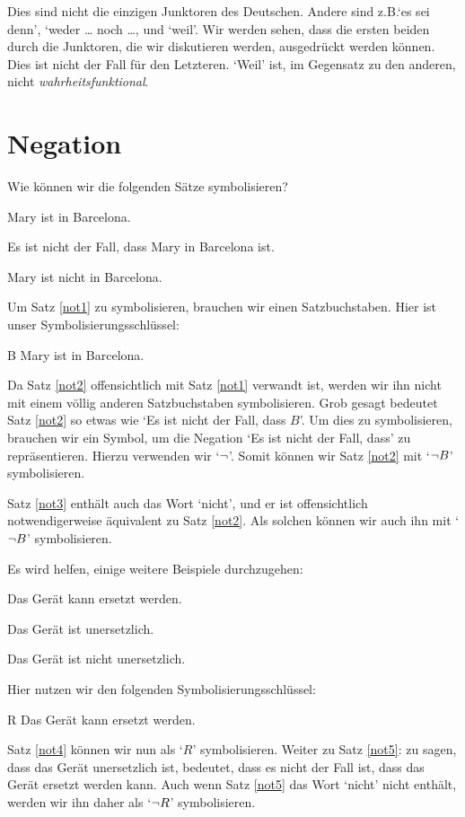 Dies sind nicht die einzigen Junktoren des Deutschen. Andere sind z.B.\@ `es sei denn', `weder \dots{} noch \dots{}, und `weil'. Wir werden sehen, dass die ersten beiden durch die Junktoren, die wir diskutieren werden, ausgedrückt werden können. Dies ist nicht der Fall für den Letzteren. `Weil' ist, im Gegensatz zu den anderen, nicht \emph{wahrheitsfunktional}. 
    
\section{Negation}

Wie können wir die folgenden Sätze symbolisieren?
	\begin{earg}
	\item[\ex{not1}] Mary ist in Barcelona.
	\item[\ex{not2}] Es ist nicht der Fall, dass Mary in Barcelona ist.
	\item[\ex{not3}] Mary ist nicht in Barcelona.
	\end{earg}
Um Satz \ref{not1} zu symbolisieren, brauchen wir einen Satzbuchstaben. Hier ist unser Symbolisierungsschlüssel:
	\begin{ekey}
		\item[B] Mary ist in Barcelona.
	\end{ekey}
Da Satz \ref{not2} offensichtlich mit Satz \ref{not1} verwandt ist, werden wir ihn nicht mit einem völlig anderen Satzbuchstaben symbolisieren. Grob gesagt bedeutet Satz \ref{not2} so etwas wie `Es ist nicht der Fall, dass $B$'. Um dies zu symbolisieren, brauchen wir ein Symbol, um die Negation `Es ist nicht der Fall, dass' zu repräsentieren. Hierzu verwenden wir `$\neg$'. Somit können wir Satz \ref{not2} mit `$\neg B$' symbolisieren.

Satz \ref{not3} enthält auch das Wort `nicht', und er ist offensichtlich notwendigerweise äquivalent zu Satz \ref{not2}. Als solchen können wir auch ihn mit `$\neg B$' symbolisieren.

Es wird helfen, einige weitere Beispiele durchzugehen: 
	\begin{earg}
		\item\label{not4} Das Gerät kann ersetzt werden.
		\item\label{not5} Das Gerät ist unersetzlich.
		\item\label{not5b} Das Gerät ist nicht unersetzlich.
	\end{earg}
Hier nutzen wir den folgenden Symbolisierungsschlüssel:
	\begin{ekey}
		\item[R] Das Gerät kann ersetzt werden.
	\end{ekey}
Satz \ref{not4} können wir nun als `$R$' symbolisieren. Weiter zu Satz \ref{not5}: zu sagen, dass das Gerät unersetzlich ist, bedeutet, dass es nicht der Fall ist, dass das Gerät ersetzt werden kann. Auch wenn Satz \ref{not5} das Wort `nicht' nicht enthält, werden wir ihn daher als `$\neg R$' symbolisieren.

